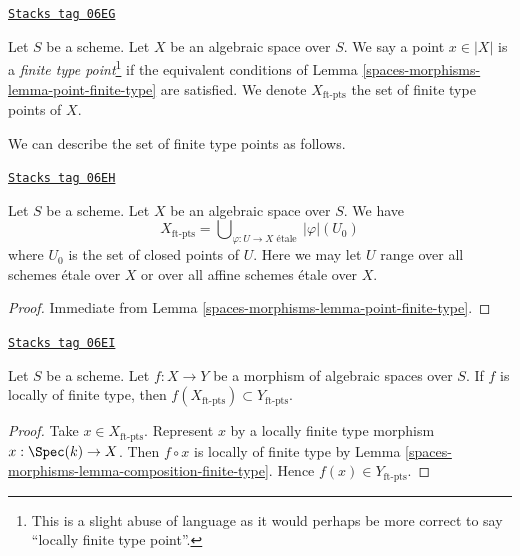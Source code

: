 \begin{definition}
\label{spaces-morphisms-definition-finite-type-point}
\href{https://stacks.math.columbia.edu/tag/06EG}{\texttt{Stacks tag 06EG}}

Let $S$ be a scheme. Let $X$ be an algebraic space over $S$.
We say a point $x \in |X|$ is a {\it finite type point}\footnote{This is a
slight abuse of language as it would perhaps be more correct to say
``locally finite type point''.} if the equivalent conditions of
Lemma \ref{spaces-morphisms-lemma-point-finite-type}
are satisfied. We denote $X_{\text{ft-pts}}$ the set of finite type points
of $X$.
\end{definition}

We can describe the set of finite type points as follows.

\begin{lemma}
\label{spaces-morphisms-lemma-identify-finite-type-points}
\href{https://stacks.math.columbia.edu/tag/06EH}{\texttt{Stacks tag 06EH}}

Let $S$ be a scheme. Let $X$ be an algebraic space over $S$. We have
$$
X_{\text{ft-pts}} =
\bigcup\nolimits_{\varphi : U \to X\text{ \'etale }} |\varphi|(U_0)
$$
where $U_0$ is the set of closed points of $U$.
Here we may let $U$ range over all schemes \'etale over $X$ or over all
affine schemes \'etale over $X$.
\end{lemma}

\begin{proof}
Immediate from
Lemma \ref{spaces-morphisms-lemma-point-finite-type}.
\end{proof}

\begin{lemma}
\label{spaces-morphisms-lemma-finite-type-points-morphism}
\href{https://stacks.math.columbia.edu/tag/06EI}{\texttt{Stacks tag 06EI}}

Let $S$ be a scheme.
Let $f : X \to Y$ be a morphism of algebraic spaces over $S$.
If $f$ is locally of finite type, then
$f(X_{\text{ft-pts}}) \subset Y_{\text{ft-pts}}$.
\end{lemma}

\begin{proof}
Take $x \in X_{\text{ft-pts}}$. Represent $x$ by a locally finite type morphism
$x : \Spec(k) \to X$. Then $f \circ x$ is locally of finite type by
Lemma \ref{spaces-morphisms-lemma-composition-finite-type}.
Hence $f(x) \in Y_{\text{ft-pts}}$.
\end{proof}


